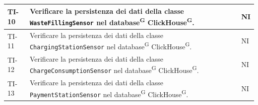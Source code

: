 \documentclass[8pt]{article}
\newcommand{\glossterm}[1]{#1\textsuperscript{G}} %
\begin{document}
\begin{longtable}{|>{\centering}p{2cm}|>{\RaggedRight}m{12cm}|>{\centering\arraybackslash}p{2cm}|}
    TI-10 & Verificare la persistenza dei dati della classe \verb|WasteFillingSensor| nel \glossterm{database} \glossterm{ClickHouse}. & NI \\
    \hline
    
    TI-11 & Verificare la persistenza dei dati della classe \verb|ChargingStationSensor| nel \glossterm{database} \glossterm{ClickHouse}. & NI \\
    \hline

    TI-12 & Verificare la persistenza dei dati della classe \verb|ChargeConsumptionSensor| nel \glossterm{database} \glossterm{ClickHouse}. & NI \\
    \hline

    TI-13 & Verificare la persistenza dei dati della classe \verb|PaymentStationSensor| nel \glossterm{database} \glossterm{ClickHouse}. & NI \\
    \hline
        
\end{longtable}
\end{document}
